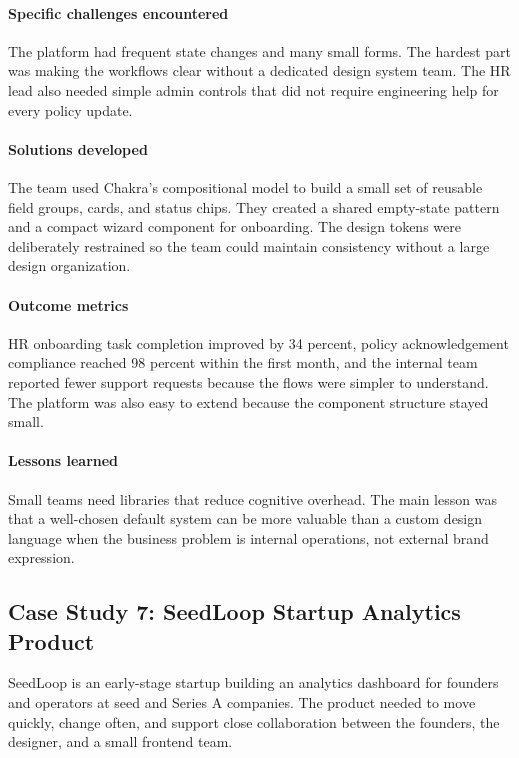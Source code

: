 \paragraph{Specific challenges encountered}
The platform had frequent state changes and many small forms. The hardest part was making the workflows clear without a dedicated design system team. The HR lead also needed simple admin controls that did not require engineering help for every policy update.

\paragraph{Solutions developed}
The team used Chakra's compositional model to build a small set of reusable field groups, cards, and status chips. They created a shared empty-state pattern and a compact wizard component for onboarding. The design tokens were deliberately restrained so the team could maintain consistency without a large design organization.

\paragraph{Outcome metrics}
HR onboarding task completion improved by 34 percent, policy acknowledgement compliance reached 98 percent within the first month, and the internal team reported fewer support requests because the flows were simpler to understand. The platform was also easy to extend because the component structure stayed small.

\paragraph{Lessons learned}
Small teams need libraries that reduce cognitive overhead. The main lesson was that a well-chosen default system can be more valuable than a custom design language when the business problem is internal operations, not external brand expression.

\subsection{Case Study 7: SeedLoop Startup Analytics Product}
SeedLoop is an early-stage startup building an analytics dashboard for founders and operators at seed and Series A companies. The product needed to move quickly, change often, and support close collaboration between the founders, the designer, and a small frontend team.

